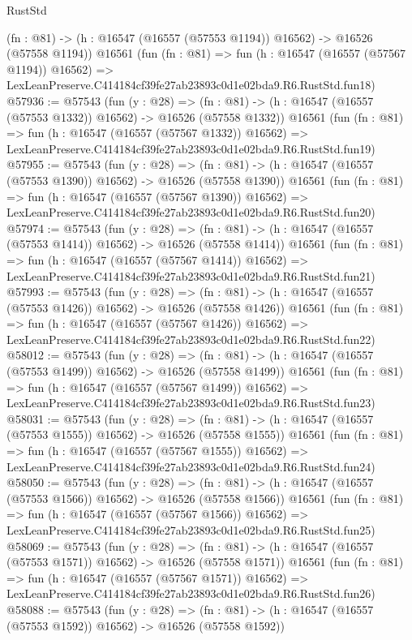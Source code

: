 \begin{lexlean}{RustStd}
\begin{coremodule}
    (fn : @81) -> (h : @16547 (@16557 (@57553 @1194)) @16562) -> @16526 (@57558 @1194))
    @16561
    (fun (fn : @81) =>
    fun (h : @16547 (@16557 (@57567 @1194)) @16562) =>
    LexLeanPreserve.C414184cf39fe27ab23893c0d1e02bda9.R6.RustStd.fun18)
@57936 := @57543
    (fun (y : @28) =>
    (fn : @81) -> (h : @16547 (@16557 (@57553 @1332)) @16562) -> @16526 (@57558 @1332))
    @16561
    (fun (fn : @81) =>
    fun (h : @16547 (@16557 (@57567 @1332)) @16562) =>
    LexLeanPreserve.C414184cf39fe27ab23893c0d1e02bda9.R6.RustStd.fun19)
@57955 := @57543
    (fun (y : @28) =>
    (fn : @81) -> (h : @16547 (@16557 (@57553 @1390)) @16562) -> @16526 (@57558 @1390))
    @16561
    (fun (fn : @81) =>
    fun (h : @16547 (@16557 (@57567 @1390)) @16562) =>
    LexLeanPreserve.C414184cf39fe27ab23893c0d1e02bda9.R6.RustStd.fun20)
@57974 := @57543
    (fun (y : @28) =>
    (fn : @81) -> (h : @16547 (@16557 (@57553 @1414)) @16562) -> @16526 (@57558 @1414))
    @16561
    (fun (fn : @81) =>
    fun (h : @16547 (@16557 (@57567 @1414)) @16562) =>
    LexLeanPreserve.C414184cf39fe27ab23893c0d1e02bda9.R6.RustStd.fun21)
@57993 := @57543
    (fun (y : @28) =>
    (fn : @81) -> (h : @16547 (@16557 (@57553 @1426)) @16562) -> @16526 (@57558 @1426))
    @16561
    (fun (fn : @81) =>
    fun (h : @16547 (@16557 (@57567 @1426)) @16562) =>
    LexLeanPreserve.C414184cf39fe27ab23893c0d1e02bda9.R6.RustStd.fun22)
@58012 := @57543
    (fun (y : @28) =>
    (fn : @81) -> (h : @16547 (@16557 (@57553 @1499)) @16562) -> @16526 (@57558 @1499))
    @16561
    (fun (fn : @81) =>
    fun (h : @16547 (@16557 (@57567 @1499)) @16562) =>
    LexLeanPreserve.C414184cf39fe27ab23893c0d1e02bda9.R6.RustStd.fun23)
@58031 := @57543
    (fun (y : @28) =>
    (fn : @81) -> (h : @16547 (@16557 (@57553 @1555)) @16562) -> @16526 (@57558 @1555))
    @16561
    (fun (fn : @81) =>
    fun (h : @16547 (@16557 (@57567 @1555)) @16562) =>
    LexLeanPreserve.C414184cf39fe27ab23893c0d1e02bda9.R6.RustStd.fun24)
@58050 := @57543
    (fun (y : @28) =>
    (fn : @81) -> (h : @16547 (@16557 (@57553 @1566)) @16562) -> @16526 (@57558 @1566))
    @16561
    (fun (fn : @81) =>
    fun (h : @16547 (@16557 (@57567 @1566)) @16562) =>
    LexLeanPreserve.C414184cf39fe27ab23893c0d1e02bda9.R6.RustStd.fun25)
@58069 := @57543
    (fun (y : @28) =>
    (fn : @81) -> (h : @16547 (@16557 (@57553 @1571)) @16562) -> @16526 (@57558 @1571))
    @16561
    (fun (fn : @81) =>
    fun (h : @16547 (@16557 (@57567 @1571)) @16562) =>
    LexLeanPreserve.C414184cf39fe27ab23893c0d1e02bda9.R6.RustStd.fun26)
@58088 := @57543
    (fun (y : @28) =>
    (fn : @81) -> (h : @16547 (@16557 (@57553 @1592)) @16562) -> @16526 (@57558 @1592))

\end{coremodule}
\end{lexlean}

